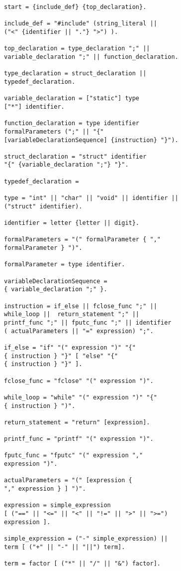 \documentclass[a4paper,12pt]{article}
\begin{document}
	\begin{lstlisting}	
start = {include_def} {top_declaration}.

include_def = "#include" (string_literal ||
("<" {identifier || "."} ">") ).

top_declaration = type_declaration ";" ||
variable_declaration ";" || function_declaration.

type_declaration = struct_declaration ||
typedef_declaration.

variable_declaration = ["static"] type 
["*"] identifier.

function_declaration = type identifier 
formalParameters (";" || "{" 
[variableDeclarationSequence] {instruction} "}").

struct_declaration = "struct" identifier
"{" {variable_declaration ";"} "}".

typedef_declaration =

type = "int" || "char" || "void" || identifier || 
("struct" identifier).

identifier = letter {letter || digit}.

formalParameters = "(" formalParameter { "," 
formalParameter } ")".

formalParameter = type identifier.

variableDeclarationSequence =
{ variable_declaration ";" }.

instruction = if_else || fclose_func ";" || 
while_loop ||  return_statement ";" || 
printf_func ";" || fputc_func ";" || identifier 
( actualParameters || "=" expression) ";".

if_else = "if" "(" expression ")" "{" 
{ instruction } "}" [ "else" "{" 
{ instruction } "}" ].

fclose_func = "fclose" "(" expression ")".

while_loop = "while" "(" expression ")" "{"
{ instruction } ")".

return_statement = "return" [expression].

printf_func = "printf" "(" expression ")".

fputc_func = "fputc" "(" expression "," 
expression ")".

actualParameters = "(" [expression {
"," expression } ] ")".

expression = simple_expression 
[ ("==" || "<=" || "<" || "!=" || ">" || ">=")
expression ].

simple_expression = ("-" simple_expression) ||
term [ ("+" || "-" || "||") term].

term = factor [ ("*" || "/" || "&") factor].


\end{lstlisting}
\end{document}
